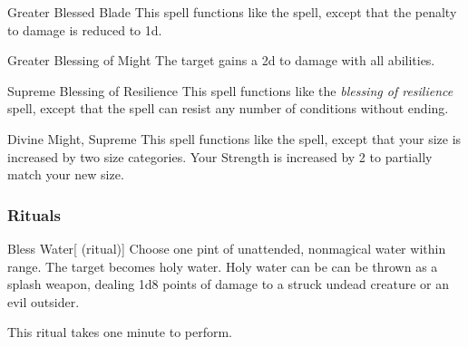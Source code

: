 \lowercase{\hypertarget{spell:Greater Blessed Blade}{}}\label{spell:Greater Blessed Blade}
\begin{ability}[\nth{5}]{\hypertarget{spell:Greater Blessed Blade}{Greater Blessed Blade}}
This spell functions like the  spell, except that the penalty to damage is reduced to \minus1d.
\end{ability}
\vspace{0.25em}



\lowercase{\hypertarget{spell:Greater Blessing of Might}{}}\label{spell:Greater Blessing of Might}
\begin{ability}[\nth{5}]{\hypertarget{spell:Greater Blessing of Might}{Greater Blessing of Might}}
The target gains a \plus2d  to damage with all abilities.
\end{ability}
\vspace{0.25em}



\lowercase{\hypertarget{spell:Supreme Blessing of Resilience}{}}\label{spell:Supreme Blessing of Resilience}
\begin{ability}[\nth{5}]{\hypertarget{spell:Supreme Blessing of Resilience}{Supreme Blessing of Resilience}}
This spell functions like the \textit{blessing of resilience} spell, except that the spell can resist any number of conditions without ending.
\end{ability}
\vspace{0.25em}



\lowercase{\hypertarget{spell:Divine Might, Supreme}{}}\label{spell:Divine Might, Supreme}
\begin{ability}[\nth{7}]{\hypertarget{spell:Divine Might, Supreme}{Divine Might, Supreme}}
This spell functions like the  spell, except that your size is increased by two size categories.
Your Strength is increased by 2 to partially match your new size.
\end{ability}
\vspace{0.25em}



\subsubsection{Rituals}


\lowercase{\hypertarget{spell:Bless Water}{}}\label{spell:Bless Water}
\begin{ability}[\nth{1}]{\hypertarget{spell:Bless Water}{Bless Water}}[ (ritual)]
Choose one pint of unattended, nonmagical water within \rngclose range.
The target becomes holy water.
Holy water can be can be thrown as a splash weapon, dealing 1d8 points of damage to a struck undead creature or an evil outsider.

This ritual takes one minute to perform.
\end{ability}
\vspace{0.25em}



